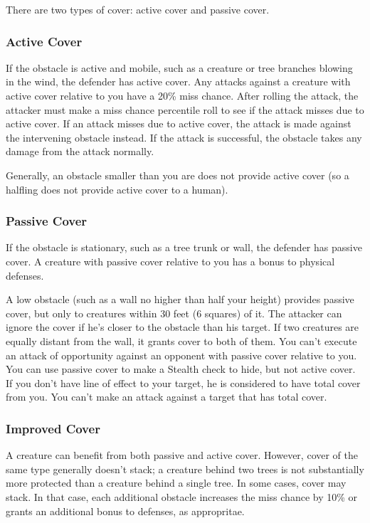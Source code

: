 There are two types of cover: active cover and passive cover.

\subsubsection{Active Cover}

If the obstacle is active and mobile, such as a creature or tree branches blowing in the wind, the defender has active cover. Any attacks against a creature with active cover relative to you have a 20\% miss chance. After rolling the attack, the attacker must make a miss chance percentile roll to see if the attack misses due to active cover. If an attack misses due to active cover, the attack is made against the intervening obstacle instead. If the attack is successful, the obstacle takes any damage from the attack normally. 

 Generally, an obstacle smaller than you are does not provide active cover (so a halfling does not provide active cover to a human). 

\subsubsection{Passive Cover}

If the obstacle is stationary, such as a tree trunk or wall, the defender has passive cover. A creature with passive cover relative to you has a  bonus to physical defenses.

 A low obstacle (such as a wall no higher than half your height) provides passive cover, but only to creatures within 30 feet (6 squares) of it. The attacker can ignore the cover if he's closer to the obstacle than his target. If two creatures are equally distant from the wall, it grants cover to both of them.
 You can't execute an attack of opportunity against an opponent with passive cover relative to you.
 You can use passive cover to make a Stealth check to hide, but not active cover.
 If you don't have line of effect to your target, he is considered to have total cover from you. You can't make an attack against a target that has total cover.

\subsubsection{Improved Cover}

A creature can benefit from both passive and active cover. However, cover of the same type generally doesn't stack; a creature behind two trees is not substantially more protected than a creature behind a single tree. In some cases, cover may stack. In that case, each additional obstacle increases the miss chance by 10\% or grants an additional  bonus to defenses, as appropritae.

